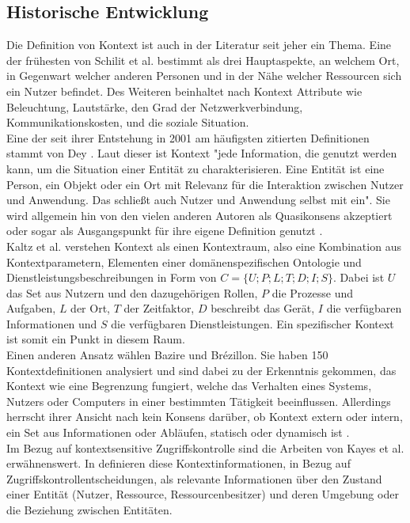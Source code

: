 \subsection{Historische Entwicklung}
Die Definition von Kontext ist auch in der Literatur seit jeher ein Thema. Eine der frühesten von Schilit et al. \cite{schilit_context-aware_1994} bestimmt als drei Hauptaspekte, an welchem Ort, in Gegenwart welcher anderen Personen und in der Nähe welcher Ressourcen sich ein Nutzer befindet. Des Weiteren beinhaltet nach \cite{schilit_context-aware_1994} Kontext Attribute wie Beleuchtung, Lautstärke, den Grad der Netzwerkverbindung, Kommunikationskosten, und die soziale Situation.\\ Eine der seit ihrer Entstehung in 2001 am häufigsten zitierten Definitionen stammt von Dey \cite{dey_understanding_2001}. Laut dieser ist Kontext "jede Information, die genutzt werden kann, um die Situation einer Entität zu charakterisieren. Eine Entität ist eine Person, ein Objekt oder ein Ort mit Relevanz für die Interaktion zwischen Nutzer und Anwendung. Das schließt auch Nutzer und Anwendung selbst mit ein". Sie wird allgemein hin von den vielen anderen Autoren als Quasikonsens akzeptiert \cite{aguilar_cameonto_2018,alegre_engineering_2016,wei_liu_survey_2011} oder sogar als Ausgangspunkt für ihre eigene Definition genutzt \cite{kayes_icaf_2012, kokinov_operational_2007}.\\ Kaltz et al. \cite{wolfgang_kaltz_context-aware_2005} verstehen Kontext als einen Kontextraum, also eine Kombination aus Kontextparametern, Elementen einer domänenspezifischen Ontologie und Dienstleistungsbeschreibungen in Form von $C = \{U;P;L;T;D;I;S\}$. Dabei ist $U$ das Set aus Nutzern und den dazugehörigen Rollen, $P$ die Prozesse und Aufgaben,  $L$ der Ort,  $T$ der Zeitfaktor,  $D$ beschreibt das Gerät, $I$ die verfügbaren Informationen und $S$ die verfügbaren Dienstleistungen. Ein spezifischer Kontext ist somit ein Punkt in diesem Raum.\\ Einen anderen Ansatz wählen Bazire und Brézillon. Sie haben 150 Kontextdefinitionen analysiert und sind dabei zu der Erkenntnis gekommen, das Kontext wie eine Begrenzung fungiert, welche das Verhalten eines Systems, Nutzers oder Computers in einer bestimmten Tätigkeit beeinflussen. Allerdings herrscht ihrer Ansicht nach kein Konsens  darüber, ob Kontext extern oder intern, ein Set aus Informationen oder Abläufen, statisch oder dynamisch ist  \cite{hutchison_understanding_2005}.\\ Im Bezug auf kontextsensitive Zugriffskontrolle sind die Arbeiten von Kayes et al. \cite{kayes_icaf_2012,kayes_survey_2020,kayes_ontological_2015} erwähnenswert. In \cite{kayes_icaf_2012} definieren diese Kontextinformationen, in Bezug auf Zugriffskontrollentscheidungen, als relevante Informationen über den Zustand einer Entität (Nutzer, Ressource, Ressourcenbesitzer) und deren Umgebung oder die Beziehung zwischen Entitäten.\\
